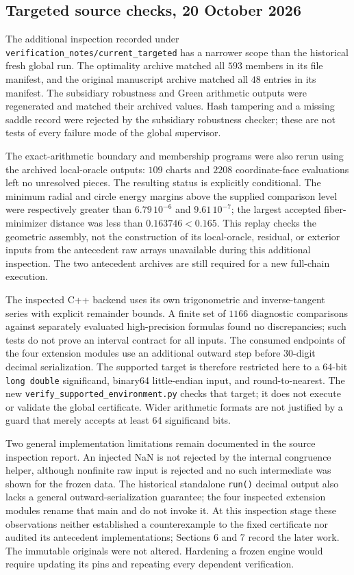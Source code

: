 \documentclass[10pt]{article}
\newcommand{\code}[1]{\nolinkurl{#1}}
\begin{document}
\subsection*{Targeted source checks, 20 October 2026}
The additional inspection recorded under
\code{verification_notes/current_targeted} has a narrower scope than the
historical fresh global run. The optimality archive matched all $593$
members in its file manifest, and the original manuscript archive matched
all $48$ entries in its manifest. The subsidiary robustness and Green
arithmetic outputs were regenerated and matched their archived values.
Hash tampering and a missing saddle record were rejected by the subsidiary
robustness checker; these are not tests of every failure mode of the global
supervisor.

The exact-arithmetic boundary and membership programs were also rerun
using the archived local-oracle outputs: $109$ charts and $2208$
coordinate-face evaluations left no unresolved pieces. The resulting
status is explicitly conditional. The minimum radial and circle energy
margins above the supplied comparison level were respectively greater
than $6.79\,10^{-6}$ and $9.61\,10^{-7}$; the largest accepted
fiber-minimizer distance was less than $0.163746<0.165$.
This replay checks the geometric assembly, not the construction of its
local-oracle, residual, or exterior inputs from the antecedent raw arrays
unavailable during this additional inspection. The two antecedent archives are still required for a new
full-chain execution.

The inspected C++ backend uses its own trigonometric and inverse-tangent
series with explicit remainder bounds. A finite set of $1166$ diagnostic
comparisons against separately evaluated high-precision formulas found
no discrepancies; such tests do not prove an interval contract for all
inputs. The consumed endpoints of the four extension modules use an
additional outward step before 30-digit decimal serialization. The
supported target is therefore restricted here to a 64-bit
\code{long double} significand, binary64 little-endian input, and
round-to-nearest. The new \code{verify_supported_environment.py} checks
that target; it does not execute or validate the global certificate.
Wider arithmetic formats are not justified by a guard that merely accepts
at least 64 significand bits.

Two general implementation limitations remain documented in the source
inspection report. An injected NaN is not rejected by the internal
congruence helper, although nonfinite raw input is rejected and no such
intermediate was shown for the frozen data. The historical standalone
\code{run()} decimal output also lacks a general outward-serialization
guarantee; the four inspected extension modules rename that main and do
not invoke it. At this inspection stage these observations neither
established a counterexample to the fixed certificate nor audited its
antecedent implementations; Sections 6 and 7 record the later work.
The immutable originals
were not altered. Hardening a frozen engine would require updating its
pins and repeating every dependent verification.
\end{document}
